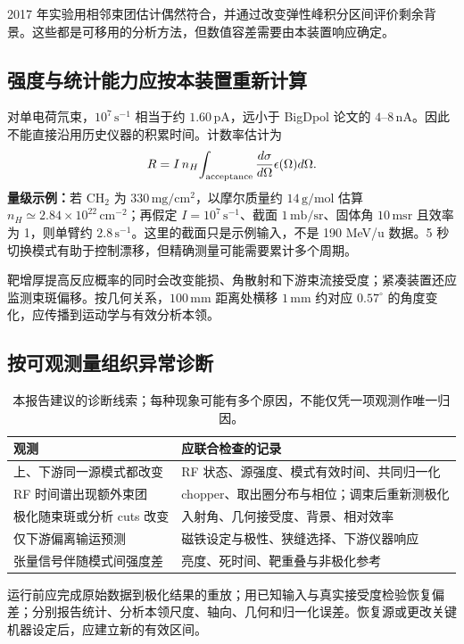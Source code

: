 \documentclass[UTF8,11pt,a4paper,fontset=none]{ctexart}
\newcommand{\unit}[1]{\,\mathrm{#1}}
\newcommand{\src}[2]{\cite[#2]{#1}}
\begin{document}
2017 年实验用相邻束团估计偶然符合，并通过改变弹性峰积分区间评价剩余背景。这些都是可移用的分析方法，但数值容差需要由本装置响应确定。\src{Sekiguchi2017}{PDF 4，II}

\subsection{强度与统计能力应按本装置重新计算}
对单电荷氘束，$10^7\unit{s^{-1}}$ 相当于约 $1.60\unit{pA}$，远小于 BigDpol 论文的 $4$--$8\unit{nA}$。因此不能直接沿用历史仪器的积累时间。计数率估计为
\begin{equation}
R=I\,n_H\!\int_{\rm acceptance}\frac{d\sigma}{d\Omega}\epsilon(\Omega)d\Omega.
\end{equation}
\textbf{量级示例：}若 CH$_2$ 为 $330\unit{mg/cm^2}$，以摩尔质量约 $14\unit{g/mol}$ 估算 $n_H\simeq2.84\times10^{22}\unit{cm^{-2}}$；再假定 $I=10^7\unit{s^{-1}}$、截面 $1\unit{mb/sr}$、固体角 $10\unit{msr}$ 且效率为 1，则单臂约 $2.8\unit{s^{-1}}$。这里的截面只是示例输入，不是 190 MeV/u 数据。5 秒切换模式有助于控制漂移，但精确测量可能需要累计多个周期。

靶增厚提高反应概率的同时会改变能损、角散射和下游束流接受度；紧凑装置还应监测束斑偏移。按几何关系，$100\unit{mm}$ 距离处横移 $1\unit{mm}$ 约对应 $0.57^\circ$ 的角度变化，应传播到运动学与有效分析本领。

\subsection{按可观测量组织异常诊断}
\begin{table}[H]\centering\small
\begin{tabularx}{\linewidth}{p{47mm}Y}\toprule
观测 & 应联合检查的记录 \\\midrule
上、下游同一源模式都改变 & RF 状态、源强度、模式有效时间、共同归一化 \\
RF 时间谱出现额外束团 & chopper、取出圈分布与相位；调束后重新测极化 \\
极化随束斑或分析 cuts 改变 & 入射角、几何接受度、背景、相对效率 \\
仅下游偏离输运预测 & 磁铁设定与极性、狭缝选择、下游仪器响应 \\
张量信号伴随模式间强度差 & 亮度、死时间、靶重叠与非极化参考 \\\bottomrule
\end{tabularx}
\caption{本报告建议的诊断线索；每种现象可能有多个原因，不能仅凭一项观测作唯一归因。}
\end{table}

运行前应完成原始数据到极化结果的重放；用已知输入与真实接受度检验恢复偏差；分别报告统计、分析本领尺度、轴向、几何和归一化误差。恢复源或更改关键机器设定后，应建立新的有效区间。
\end{document}

